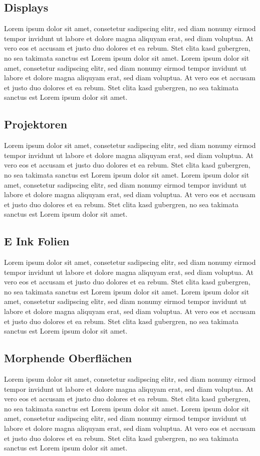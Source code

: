 \subsection{Displays}
Lorem ipsum dolor sit amet, consetetur sadipscing elitr, sed diam nonumy eirmod tempor invidunt ut labore et dolore magna aliquyam erat, sed diam voluptua. At vero eos et accusam et justo duo dolores et ea rebum. Stet clita kasd gubergren, no sea takimata sanctus est Lorem ipsum dolor sit amet. Lorem ipsum dolor sit amet, consetetur sadipscing elitr, sed diam nonumy eirmod tempor invidunt ut labore et dolore magna aliquyam erat, sed diam voluptua. At vero eos et accusam et justo duo dolores et ea rebum. Stet clita kasd gubergren, no sea takimata sanctus est Lorem ipsum dolor sit amet.
\subsection{Projektoren}
Lorem ipsum dolor sit amet, consetetur sadipscing elitr, sed diam nonumy eirmod tempor invidunt ut labore et dolore magna aliquyam erat, sed diam voluptua. At vero eos et accusam et justo duo dolores et ea rebum. Stet clita kasd gubergren, no sea takimata sanctus est Lorem ipsum dolor sit amet. Lorem ipsum dolor sit amet, consetetur sadipscing elitr, sed diam nonumy eirmod tempor invidunt ut labore et dolore magna aliquyam erat, sed diam voluptua. At vero eos et accusam et justo duo dolores et ea rebum. Stet clita kasd gubergren, no sea takimata sanctus est Lorem ipsum dolor sit amet.
\subsection{E Ink Folien}
Lorem ipsum dolor sit amet, consetetur sadipscing elitr, sed diam nonumy eirmod tempor invidunt ut labore et dolore magna aliquyam erat, sed diam voluptua. At vero eos et accusam et justo duo dolores et ea rebum. Stet clita kasd gubergren, no sea takimata sanctus est Lorem ipsum dolor sit amet. Lorem ipsum dolor sit amet, consetetur sadipscing elitr, sed diam nonumy eirmod tempor invidunt ut labore et dolore magna aliquyam erat, sed diam voluptua. At vero eos et accusam et justo duo dolores et ea rebum. Stet clita kasd gubergren, no sea takimata sanctus est Lorem ipsum dolor sit amet.
\subsection{Morphende Oberflächen}
Lorem ipsum dolor sit amet, consetetur sadipscing elitr, sed diam nonumy eirmod tempor invidunt ut labore et dolore magna aliquyam erat, sed diam voluptua. At vero eos et accusam et justo duo dolores et ea rebum. Stet clita kasd gubergren, no sea takimata sanctus est Lorem ipsum dolor sit amet. Lorem ipsum dolor sit amet, consetetur sadipscing elitr, sed diam nonumy eirmod tempor invidunt ut labore et dolore magna aliquyam erat, sed diam voluptua. At vero eos et accusam et justo duo dolores et ea rebum. Stet clita kasd gubergren, no sea takimata sanctus est Lorem ipsum dolor sit amet.

